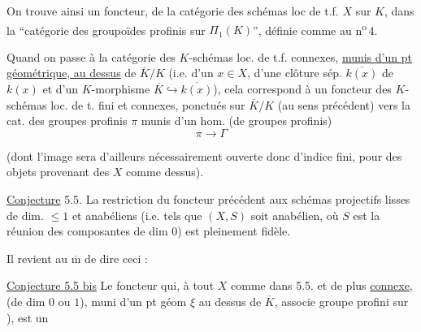 

On trouve ainsi un foncteur, de la catégorie des schémas loc de t.f.
$X$ sur $K$, dans la ``catégorie des groupoïdes profinis sur
$\Pi_1(K)$'', définie comme au n\textsuperscript{o}\,4.

Quand on passe à la catégorie des $K$-schémas loc. de t.f.
connexes,  \uline{munis d'un pt géométrique,
au dessus} de $\overline K/K$ (i.e. d'un $x\in X$,
 d'une clôture sép. $\overline{k(x)}$ de $k(x)$ et d'un
$K$-morphisme $\overline K\hookrightarrow\overline{k(x)}$), cela correspond
à un foncteur des $K$-schémas loc. de t. fini et connexes, ponctués sur
$\overline K/K$ (au sens précédent) vers la cat. des
 groupes profinis  $\pi$
munis d'un hom. (de groupes profinis)
\[
\pi\longrightarrow\Gamma
\]


(dont l'image sera d'ailleurs nécessairement ouverte donc
 d'indice fini, pour des objets provenant des $X$ comme dessus).

\uline{Conjecture} 5.5. La restriction du foncteur précédent
aux schémas projectifs lisses de dim. $\leq 1$ et anabéliens
(i.e. tels que $(X,S)$ soit anabélien, où $S$ est la réunion des
composantes de dim $0$) est pleinement fidèle.


Il revient au $\overline{\mathrm m}$ de dire ceci :


\uline{Conjecture 5.5 bis} Le foncteur qui, à tout $X$
 comme dans 5.5. et de plus \uline{connexe},
(de dim $0$ ou $1$), muni d'un pt géom $\xi$ au dessus de
$\overline K$, associe  groupe
profini  sur
), est un


